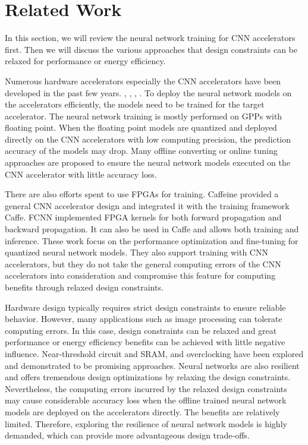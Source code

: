 \section{Related Work} \label{sec:relatedwork}
In this section, we will review the neural network training for CNN accelerators first.
Then we will discuss the various approaches that design constraints can be relaxed for
performance or energy efficiency. 

Numerous hardware accelerators especially the CNN accelerators have
been developed in the past few years. \cite{Cnvlutin_25} 
\cite{deepburing_12}, \cite{Aydonat_27}, 
\cite{Caffeine_6}, \cite{Wei_29}. To 
deploy the neural network models on the accelerators efficiently, 
the models need to be trained for the target accelerator. 
The neural network training is mostly performed on GPPs with floating point.
When the floating point models are quantized and deployed directly 
on the CNN accelerators with low computing precision, the prediction 
accuracy of the models may drop\cite{Matthieu2014_8, Hwang2014_17}. 
Many offline converting or online tuning approaches are proposed to 
ensure the neural network models executed on the CNN accelerator 
with little accuracy loss\cite{BinaryConnect_14,courbariaux2014}. 

There are also efforts spent to use FPGAs for training. 
Caffeine\cite{Caffeine_6} provided a general CNN accelerator design and integrated it with 
the training framework Caffe. FCNN\cite{fcnn_5} implemented FPGA kernels 
for both forward propagation and backward propagation. It can also be used in Caffe 
and allows both training and inference. These work focus on the performance optimization 
and fine-tuning for quantized neural network models. 
They also support training with CNN accelerators, but they do not take the general 
computing errors of the CNN accelerators into consideration and compromise this 
feature for computing benefits through relaxed design constraints.

Hardware design typically requires strict design constraints to ensure 
reliable behavior. However, many applications such as image processing 
can tolerate computing errors. In this case, design constraints can be 
relaxed and great performance or energy efficiency benefits can be achieved 
with little negative influence. Near-threshold circuit\cite{M2017NT,BH2005} and SRAM\cite{G2010SRAM,SA2008SRAM}, 
and overclocking \cite{overclock_3} have been explored and demonstrated 
to be promising approaches. Neural networks are also resilient and 
offers tremendous design optimizations by relaxing the design constraints. 
Nevertheless, the computing errors incurred by the relaxed design constraints 
may cause considerable accuracy loss when the offline 
trained neural network models are deployed on the accelerators directly. 
The benefits are relatively limited. Therefore, exploring the resilience 
of neural network models is highly demanded, which can provide more 
advantageous design trade-offs. 
